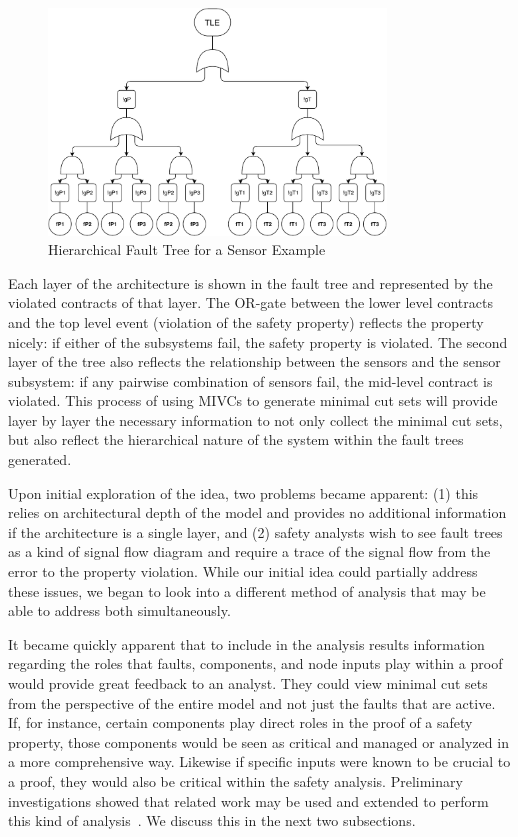 \begin{figure}[h!]
	\centering
	\includegraphics[trim=0 0 0 0,clip,width=0.8\textwidth]{images/ftSensor.pdf}
	\caption{Hierarchical Fault Tree for a Sensor Example}
	\label{fig:ftSensor}
\end{figure}

Each layer of the architecture is shown in the fault tree and represented by the violated contracts of that layer. The OR-gate between the lower level contracts and the top level event (violation of the safety property) reflects the property nicely: if either of the subsystems fail, the safety property is violated. The second layer of the tree also reflects the relationship between the sensors and the sensor subsystem: if any pairwise combination of sensors fail, the mid-level contract is violated. This process of using MIVCs to generate minimal cut sets will provide layer by layer the necessary information to not only collect the minimal cut sets, but also reflect the hierarchical nature of the system within the fault trees generated.

Upon initial exploration of the idea, two problems became apparent: (1) this relies on architectural depth of the model and provides no additional information if the architecture is a single layer, and (2) safety analysts wish to see fault trees as a kind of signal flow diagram and require a trace of the signal flow from the error to the property violation. While our initial idea could partially address these issues, we began to look into a different method of analysis that may be able to address both simultaneously. 

It became quickly apparent that to include in the analysis results information regarding the roles that faults, components, and node inputs play within a proof would provide great feedback to an analyst. They could view minimal cut sets from the perspective of the entire model and not just the faults that are active. If, for instance, certain components play direct roles in the proof of a safety property, those components would be seen as critical and managed or analyzed in a more comprehensive way. Likewise if specific inputs were known to be crucial to a proof, they would also be critical within the safety analysis. Preliminary investigations showed that related work may be used and extended to perform this kind of analysis~\cite{9081652}. We discuss this in the next two subsections.

